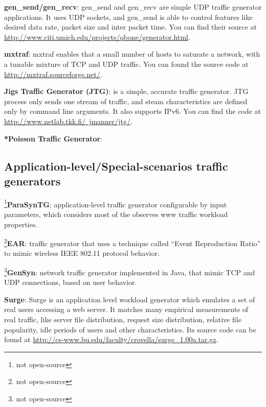 \textbf{gen\_send/gen\_recv}\cite{web-gensend-genrecv}: gen\_send and gen\_recv are simple UDP traffic generator applications. It uses UDP sockets, and  gen\_send is able to control features like desired data rate, packet size and inter packet time. You can find their source at \href{http://www.citi.umich.edu/projects/qbone/generator.html}{http://www.citi.umich.edu/projects/qbone/generator.html}. 


\textbf{mxtraf}\cite{web-mxtraf}: mxtraf enables that a small number of hosts to saturate a network, with a tunable mixture of TCP and UDP traffic. You can found the source code at \href{http://mxtraf.sourceforge.net/}{http://mxtraf.sourceforge.net/}. 

\textbf{Jigs Traffic Generator (JTG)}\cite{web-jtg}: is a simple, accurate traffic generator. JTG process only sends one stream of traffic, and steam characteristics are defined only by command line arguments. It also supports IPv6. You can find the code at \href{http://www.netlab.tkk.fi/~jmanner/jtg/}{http://www.netlab.tkk.fi/~jmanner/jtg/}. 


\textbf{*Poisson Traffic Generator}:


\subsection{Application-level/Special-scenarios traffic generators}


\footnote{not open-source}\textbf{ParaSynTG}\cite{parasyntg-paper}: application-level traffic generator configurable by input parameters, which considers most of the observes www traffic workload properties. 


\footnote{not open-source}\textbf{EAR}\cite{validate-trafficgen}: traffic generator that uses a technique called “Event Reproduction Ratio”  to mimic wireless IEEE 802.11 protocol behavior.


\footnote{not open-source}\textbf{GenSyn}\cite{web-gensyn}: network traffic generator implemented in Java, that mimic TCP and UDP connections, based on user behavior. 


\textbf{Surge}\cite{surge-paper}: Surge is an application level workload generator which emulates a set of real users accessing a web server. It matches many empirical measurements of real traffic, like server file distribution, request size distribution, relative file popularity, idle periods of users and other characteristics. Its source code can be  found at \href{http://cs-www.bu.edu/faculty/crovella/surge_1.00a.tar.gz}{http://cs-www.bu.edu/faculty/crovella/surge\_1.00a.tar.gz}. 

